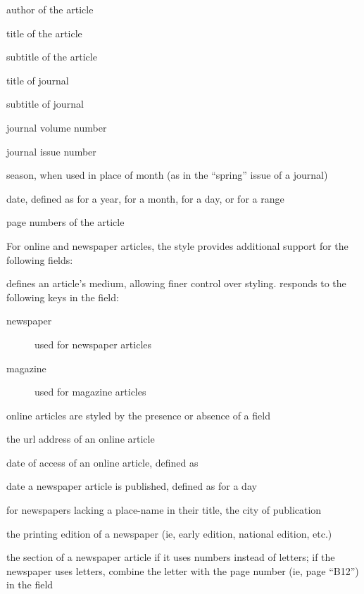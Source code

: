 \documentclass{ltxdockit}[2011/03/25]
\newcommand*{\Biblatexmla}{\sty{Biblatex-mla}\xspace}
\newenvironment*{optionslistNOT}
  {\list{}{%
     \setlength{\labelwidth}{\marglistwidth}%
     \setlength{\labelsep}{\marglistsep}%
     \setlength{\leftmargin}{50pt}%
     \renewcommand*{\makelabel}[1]{\hss\marglistfont##1}}%
   \def\optionitem##1{%
     \item[{\textbf{##1}}]}}
  {\endlist}
\begin{document}
\begin{optionslistNOT}

	\optionitem{author} author of the article
	
	\optionitem{title} title of the article
	
	\optionitem{subtitle} subtitle of the article
	
	\optionitem{journaltitle} title of journal
	
	\optionitem{journalsubtitle} subtitle of journal
	
	\optionitem{volume} journal volume number
	
	\optionitem{number} journal issue number
	
	\optionitem{issue} season, when used in place of month (as in the ``spring'' issue of a journal)
	
	\optionitem{date} date, defined as  for a year,  for a month,  for a day, or  for a range
	
	\optionitem{pages} page numbers of the article

\end{optionslistNOT}

For online and newspaper articles, the style provides additional support for the following fields:

\begin{optionslistNOT}
	
	\optionitem{entrysubtype} defines an article's medium, allowing finer control over styling. \Biblatexmla responds to the following keys in the  field:
	
	\begin{description}
		\item[newspaper] used for newspaper articles
		\item[magazine] used for magazine articles
	\end{description}
	
	online articles are styled by the presence or absence of a  field
	
	\optionitem{url} the url address of an online article
	
	\optionitem{urldate} date of access of an online article, defined as 
	
	\optionitem{date} date a newspaper article is published, defined as  for a day
	
	\optionitem{location} for newspapers lacking a place-name in their title, the city of publication
	
	\optionitem{version} the printing edition of a newspaper (ie, early edition, national edition, etc.)
	
	\optionitem{chapter} the section of a newspaper article if it uses numbers instead of letters; if the newspaper uses letters, combine the letter with the page number (ie, page ``B12'') in the  field
	
\end{optionslistNOT}
\end{document}
